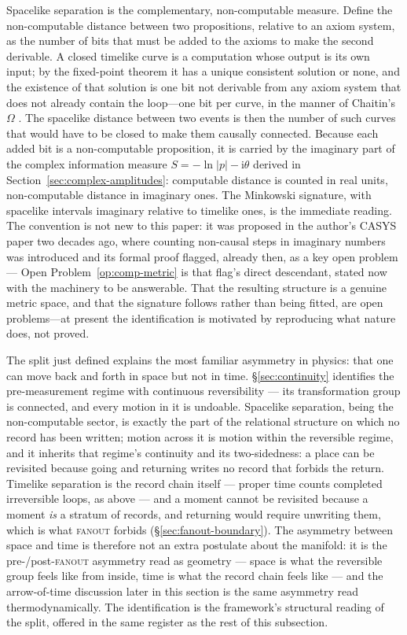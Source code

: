 Spacelike separation is the complementary, non-computable measure. Define the
non-computable distance between two propositions, relative to an axiom system, as
the number of bits that must be added to the axioms to make the second derivable.
A closed timelike curve is a computation whose output is its own input; by the
fixed-point theorem it has a unique consistent solution or none, and the
existence of that solution is one bit not derivable from any axiom system that
does not already contain the loop---one bit per curve, in the manner of Chaitin's
$\Omega$ \autocite{Chaitin1998}. The spacelike distance between two events is then
the number of such curves that would have to be closed to make them causally
connected. Because each added bit is a non-computable proposition, it is carried
by the imaginary part of the complex information measure
$S=-\ln\lvert p\rvert-\mathrm{i}\theta$ derived in
Section~\ref{sec:complex-amplitudes}: computable distance is counted in real
units, non-computable distance in imaginary ones. The Minkowski signature, with
spacelike intervals imaginary relative to timelike ones, is the immediate reading. The convention is not new to this paper: it was proposed in the author's CASYS paper two
decades ago, where counting non-causal steps in imaginary numbers was introduced and its formal
proof flagged, already then, as a key open problem \autocite{small_2006} ---
Open Problem~\ref{op:comp-metric} is that flag's direct descendant, stated now with the machinery
to be answerable.
That the resulting structure is a genuine metric space, and that the signature
follows rather than being fitted, are open problems---at present the
identification is motivated by reproducing what nature does, not proved.

The split just defined explains the most familiar asymmetry in physics: that one can move back and
forth in space but not in time. \S\ref{sec:continuity} identifies the pre-measurement regime with
continuous reversibility --- its transformation group is connected, and every motion in it is
undoable. Spacelike separation, being the non-computable sector, is exactly the part of the
relational structure on which no record has been written; motion across it is motion within the
reversible regime, and it inherits that regime's continuity and its two-sidedness: a place can be
revisited because going and returning writes no record that forbids the return. Timelike separation
is the record chain itself --- proper time counts completed irreversible loops, as above --- and a
moment cannot be revisited because a moment \emph{is} a stratum of records, and returning would
require unwriting them, which is what \textsc{fanout} forbids (\S\ref{sec:fanout-boundary}). The
asymmetry between space and time is therefore not an extra postulate about the manifold: it is the
pre-/post-\textsc{fanout} asymmetry read as geometry --- space is what the reversible group feels
like from inside, time is what the record chain feels like --- and the arrow-of-time discussion
later in this section is the same asymmetry read thermodynamically. The identification is the
framework's structural reading of the split, offered in the same register as the rest of this
subsection.

